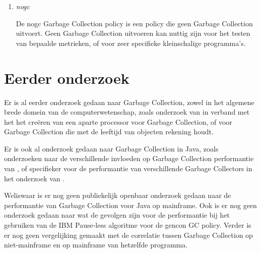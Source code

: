 \begin{enumerate}
    \item \textit{nogc}
    
            De nogc Garbage Collection policy is een policy die geen Garbage Collection uitvoert.
            Geen Garbage Collection uitvoeren kan nuttig zijn voor het testen van bepaalde metrieken, of voor zeer specifieke kleinschalige programma's.
        


\end{enumerate}
\autocite{IBM2023}

\section{Eerder onderzoek}
\label{sec:eerderonderzoek}
Er is al eerder onderzoek gedaan naar Garbage Collection, zowel in het algemene brede domein van de computerwetenschap, zoals onderzoek van \textcite{Dijkstra1978} in verband met het het creëren van een aparte processor voor Garbage Collection, of \textcite{Lieberman1981} voor Garbage Collection die met de leeftijd van objecten rekening houdt.


Er is ook al onderzoek gedaan naar Garbage Collection in Java, zoals onderzoeken naar de verschillende invloeden op Garbage Collection performantie van \textcite{Dijkstra1978}, of specifieker voor de performantie van verschillende Garbage Collectors in het onderzoek van \textcite{Grgic2018}.


Weliswaar is er nog geen publiekelijk openbaar onderzoek gedaan naar de performantie van Garbage Collection voor Java op mainframe.
Ook is er nog geen onderzoek gedaan naar wat de gevolgen zijn voor de performantie bij het gebruiken van de IBM Pause-less algoritme voor de gencon GC policy.
Verder is er nog geen vergelijking gemaakt met de correlatie tussen Garbage Collection op niet-mainframe en op mainframe van hetzelfde programma.
